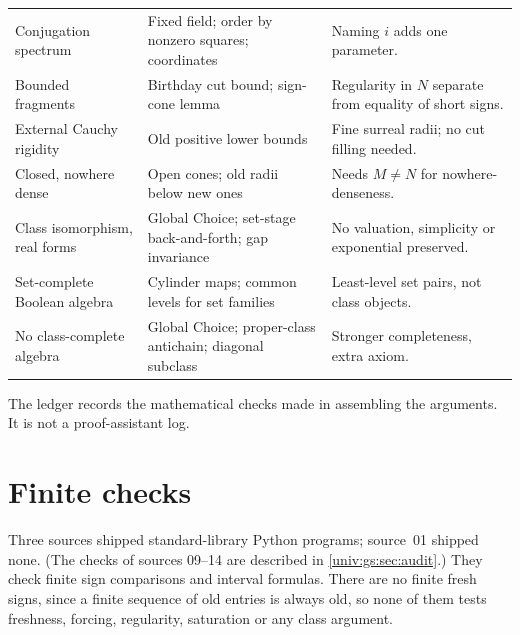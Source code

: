 \documentclass[11pt,letterpaper]{article}
\numberwithin{equation}{section}
\theoremstyle{definition}
\theoremstyle{remark}
\begin{document}
{\begin{longtable}{@{}P{0.27\textwidth}P{0.36\textwidth}P{0.29\textwidth}@{}}
Conjugation spectrum & Fixed field; order by nonzero squares; coordinates & Naming $i$ adds one parameter.\\[3pt]
Bounded fragments & Birthday cut bound; sign-cone lemma & Regularity in $N$ separate from equality of short signs.\\[3pt]
External Cauchy rigidity & Old positive lower bounds & Fine surreal radii; no cut filling needed.\\[3pt]
Closed, nowhere dense & Open cones; old radii below new ones & Needs $M\ne N$ for nowhere-denseness.\\[3pt]
Class isomorphism, real forms & Global Choice; set-stage back-and-forth; gap invariance & No valuation, simplicity or exponential preserved.\\[3pt]
Set-complete Boolean algebra & Cylinder maps; common levels for set families & Least-level set pairs, not class objects.\\[3pt]
No class-complete algebra & Global Choice; proper-class antichain; diagonal subclass & Stronger completeness, extra axiom.\\
\bottomrule
\end{longtable}}

The ledger records the mathematical checks made in assembling the arguments. It
is not a proof-assistant log.

\section{Finite checks}\label{univ:app:checks}

Three sources shipped standard-library Python programs; source~01 shipped none.
(The checks of sources 09--14 are described in \cref{univ:gs:sec:audit}.)
They check finite sign comparisons and interval formulas. There are no finite
fresh signs, since a finite sequence of old entries is always old, so none of
them tests freshness, forcing, regularity, saturation or any class argument.
\end{document}
